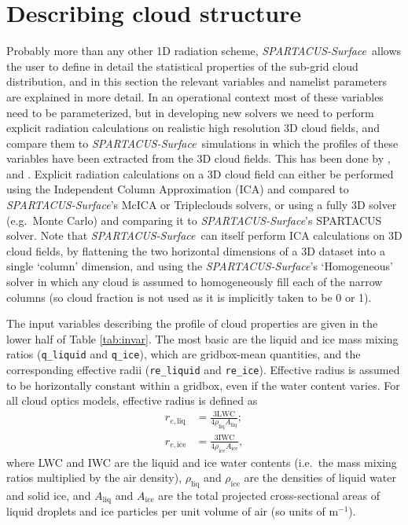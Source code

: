 \documentclass[a4,oneside]{article}
\def\codesize{\small}
\def\spsurf{\emph{SPARTACUS-Surface}}
\def\code#1{{\codesize\texttt{#1}}}
\begin{document}
\section{Describing cloud structure}
\label{sec:cloud_structure}
Probably more than any other 1D radiation scheme, \spsurf\ allows the
user to define in detail the statistical properties of the sub-grid
cloud distribution, and in this section the relevant variables and
namelist parameters are explained in more detail.  In an operational
context most of these variables need to be parameterized, but in
developing new solvers we need to perform explicit radiation
calculations on realistic high resolution 3D cloud fields, and compare
them to \spsurf\ simulations in which the profiles of these variables
have been extracted from the 3D cloud fields.  This has been done by
\cite{Schafer+2016}, \cite{Hogan+2016} and \cite{Hogan+2019}. Explicit
radiation calculations on a 3D cloud field can either be performed
using the Independent Column Approximation (ICA) and compared to
\spsurf's McICA or Tripleclouds solvers, or using a fully 3D solver
(e.g.\ Monte Carlo) and comparing it to \spsurf's SPARTACUS solver.
Note that \spsurf\ can itself perform ICA calculations on 3D cloud
fields, by flattening the two horizontal dimensions of a 3D dataset
into a single `column' dimension, and using the \spsurf's `Homogeneous'
solver in which any cloud is assumed to homogeneously fill each of the
narrow columns (so cloud fraction is not used as it is implicitly
taken to be 0 or 1).

The input variables describing the profile of cloud properties are
given in the lower half of Table \ref{tab:invar}. The most basic are
the liquid and ice mass mixing ratios (\code{q\_liquid} and
\code{q\_ice}), which are gridbox-mean quantities, and the
corresponding effective radii (\code{re\_liquid} and
\code{re\_ice}). Effective radius is assumed to be horizontally
constant within a gridbox, even if the water content varies.  For all
cloud optics models, effective radius is defined as
%
\begin{align}
r_{e,\mathrm{liq}}&=\frac{3\mathrm{LWC}}{4\rho_\mathrm{liq}A_\mathrm{liq}};\\
r_{e,\mathrm{ice}}&=\frac{3\mathrm{IWC}}{4\rho_\mathrm{ice}A_\mathrm{ice}},
\end{align}
%
where LWC and IWC are the liquid and ice water contents (i.e.\ the
mass mixing ratios multiplied by the air density), $\rho_\mathrm{liq}$
and $\rho_\mathrm{ice}$ are the densities of liquid water and solid
ice, and $A_\mathrm{liq}$ and $A_\mathrm{ice}$ are the total projected
cross-sectional areas of liquid droplets and ice particles per unit
volume of air (so units of m$^{-1}$). 
\end{document}
